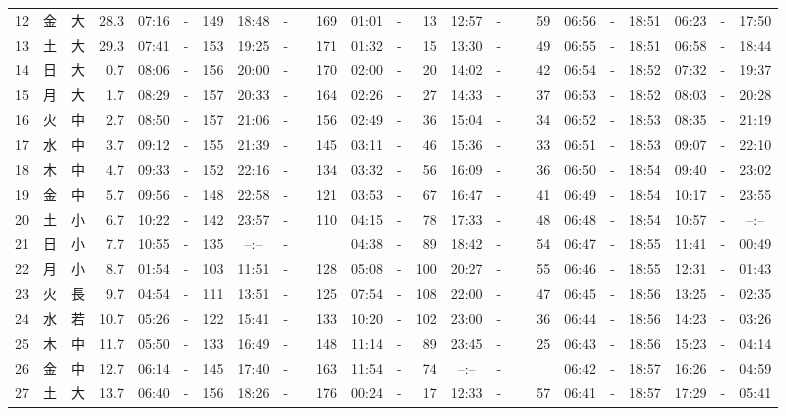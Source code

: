 \documentclass[12pt,a4j]{jsarticle}
\begin{document}
\begin{table}[htbp]
\begin{center}
{\begin{tabular}{|rc|cr|ccrccr|ccrccr|ccc|ccc|}
12 & 金 & 大 & 28.3 &  07:16 &-& 149 &  18:48 &-& 169 &  01:01 &-&  13 &  12:57 &-&  59 & 06:56 & -& 18:51 & 06:23 & -& 17:50 \\
13 & 土 & 大 & 29.3 &  07:41 &-& 153 &  19:25 &-& 171 &  01:32 &-&  15 &  13:30 &-&  49 & 06:55 & -& 18:51 & 06:58 & -& 18:44 \\
14 & 日 & 大 &  0.7 &  08:06 &-& 156 &  20:00 &-& 170 &  02:00 &-&  20 &  14:02 &-&  42 & 06:54 & -& 18:52 & 07:32 & -& 19:37 \\
15 & 月 & 大 &  1.7 &  08:29 &-& 157 &  20:33 &-& 164 &  02:26 &-&  27 &  14:33 &-&  37 & 06:53 & -& 18:52 & 08:03 & -& 20:28 \\
16 & 火 & 中 &  2.7 &  08:50 &-& 157 &  21:06 &-& 156 &  02:49 &-&  36 &  15:04 &-&  34 & 06:52 & -& 18:53 & 08:35 & -& 21:19 \\
17 & 水 & 中 &  3.7 &  09:12 &-& 155 &  21:39 &-& 145 &  03:11 &-&  46 &  15:36 &-&  33 & 06:51 & -& 18:53 & 09:07 & -& 22:10 \\
18 & 木 & 中 &  4.7 &  09:33 &-& 152 &  22:16 &-& 134 &  03:32 &-&  56 &  16:09 &-&  36 & 06:50 & -& 18:54 & 09:40 & -& 23:02 \\
19 & 金 & 中 &  5.7 &  09:56 &-& 148 &  22:58 &-& 121 &  03:53 &-&  67 &  16:47 &-&  41 & 06:49 & -& 18:54 & 10:17 & -& 23:55 \\
20 & 土 & 小 &  6.7 &  10:22 &-& 142 &  23:57 &-& 110 &  04:15 &-&  78 &  17:33 &-&  48 & 06:48 & -& 18:54 & 10:57 & -& --:-- \\
21 & 日 & 小 &  7.7 &  10:55 &-& 135 &  --:-- &-&~~~~~ &  04:38 &-&  89 &  18:42 &-&  54 & 06:47 & -& 18:55 & 11:41 & -& 00:49 \\
22 & 月 & 小 &  8.7 &  01:54 &-& 103 &  11:51 &-& 128 &  05:08 &-& 100 &  20:27 &-&  55 & 06:46 & -& 18:55 & 12:31 & -& 01:43 \\
23 & 火 & 長 &  9.7 &  04:54 &-& 111 &  13:51 &-& 125 &  07:54 &-& 108 &  22:00 &-&  47 & 06:45 & -& 18:56 & 13:25 & -& 02:35 \\
24 & 水 & 若 & 10.7 &  05:26 &-& 122 &  15:41 &-& 133 &  10:20 &-& 102 &  23:00 &-&  36 & 06:44 & -& 18:56 & 14:23 & -& 03:26 \\
25 & 木 & 中 & 11.7 &  05:50 &-& 133 &  16:49 &-& 148 &  11:14 &-&  89 &  23:45 &-&  25 & 06:43 & -& 18:56 & 15:23 & -& 04:14 \\
26 & 金 & 中 & 12.7 &  06:14 &-& 145 &  17:40 &-& 163 &  11:54 &-&  74 &  --:-- &-&~~~~~ & 06:42 & -& 18:57 & 16:26 & -& 04:59 \\
27 & 土 & 大 & 13.7 &  06:40 &-& 156 &  18:26 &-& 176 &  00:24 &-&  17 &  12:33 &-&  57 & 06:41 & -& 18:57 & 17:29 & -& 05:41 \\

\end{tabular}}
\end{center}
\end{table}
\end{document}
